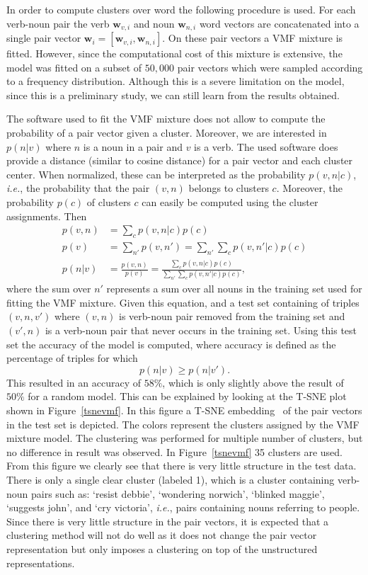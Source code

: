 \documentclass[11pt]{scrartcl}
\newcommand{\ie}{\textit{i.e.}}
\newcommand{\bw}{\boldsymbol{w}}
\begin{document}
In order to compute clusters over word the following procedure is
used.  For each verb-noun pair the verb $\bw_{v,i}$ and noun $\bw_{n,
i}$ word vectors are concatenated into a single pair vector $\bw_i =
[\bw_{v,i}, \bw_{n,i}]$. On these pair vectors a VMF mixture is
fitted. However, since the computational cost of this mixture is
extensive, the model was fitted on a subset of $50,000$ pair vectors
which were sampled according to a frequency distribution. Although
this is a severe limitation on the model, since this is a preliminary
study, we can still learn from the results obtained.

The software used to fit the VMF mixture does not allow to compute the
probability of a pair vector given a cluster. Moreover, we are
interested in $p(n|v)$ where $n$ is a noun in a pair and $v$ is a
verb. The used software does provide a distance (similar to cosine
distance) for a pair vector and each cluster center. When normalized,
these can be interpreted as the probability $p(v, n| c)$, \ie, the
probability that the pair $(v, n)$ belongs to clusters $c$. Moreover,
the probability $p(c)$ of clusters $c$ can easily be computed using the
cluster assignments. Then
\begin{align*}
  p(v, n) &= \sum_c p(v, n|c)p(c) \\
  p(v) &= \sum_{n'} p(v, n') = \sum_{n'} \sum_{c} p(v, n'|c)p(c) \\
  p(n|v) &= \frac{p(v, n)}{p(v)} = \frac{\sum_c p(v, n|c)p(c)}{\sum_{n'} \sum_{c} p(v, n'|c)p(c)},
 \end{align*}
 where the sum over $n'$ represents a sum over all nouns in the
training set used for fitting the VMF mixture. Given this equation,
and a test set containing of triples $(v, n, v')$ where $(v, n)$ is
verb-noun pair removed from the training set and $(v', n)$ is a
verb-noun pair that never occurs in the training set. Using this test
set the accuracy of the model is computed, where accuracy is defined
as the percentage of triples for which
\[
  p(n|v) \ge p(n|v').
\]
This resulted in an accuracy of $58\%$, which is only slightly above
the result of $50\%$ for a random model. This can be explained by
looking at the T-SNE plot shown in Figure~\ref{tsnevmf}. In this
figure a T-SNE embedding~\cite{maaten2008visualizing} of the pair
vectors in the test set is depicted.  The colors represent the
clusters assigned by the VMF mixture model. The clustering was
performed for multiple number of clusters, but no difference in result
was observed. In Figure~\ref{tsnevmf} 35 clusters are used.  From this
figure we clearly see that there is very little structure in the test
data. There is only a single clear cluster (labeled 1), which is a
cluster containing verb-noun pairs such as: `resist debbie',
`wondering norwich', `blinked maggie', `suggests john', and `cry
victoria', \ie, pairs containing nouns referring to people. Since
there is very little structure in the pair vectors, it is expected
that a clustering method will not do well as it does not change the
pair vector representation but only imposes a clustering on top of the
unstructured representations.
\end{document}

